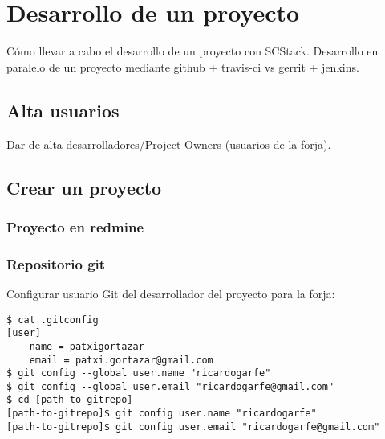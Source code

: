 %
% 

\chapter{Desarrollo de un proyecto}
\label{chap:desarrollo}

\par Cómo llevar a cabo el desarrollo de un proyecto con SCStack. Desarrollo en paralelo de un proyecto mediante github + travis-ci vs gerrit + jenkins.

\section{Alta usuarios}
\label{sec:alta-usuarios}

\par Dar de alta desarrolladores/Project Owners (usuarios de la forja).


\section{Crear un proyecto}
\label{sec:crear-proyecto}

\subsection{Proyecto en redmine}
\label{sub:proyeto-redmine}


\subsection{Repositorio git}
\label{sub:repo-git}

\par Configurar usuario Git del desarrollador del proyecto para la forja:

\lstset{style=bashbasico}
\begin{lstlisting}[frame=trbl]
$ cat .gitconfig 
[user]
    name = patxigortazar
    email = patxi.gortazar@gmail.com
$ git config --global user.name "ricardogarfe"
$ git config --global user.email "ricardogarfe@gmail.com"
$ cd [path-to-gitrepo]
[path-to-gitrepo]$ git config user.name "ricardogarfe"
[path-to-gitrepo]$ git config user.email "ricardogarfe@gmail.com"
\end{lstlisting}

